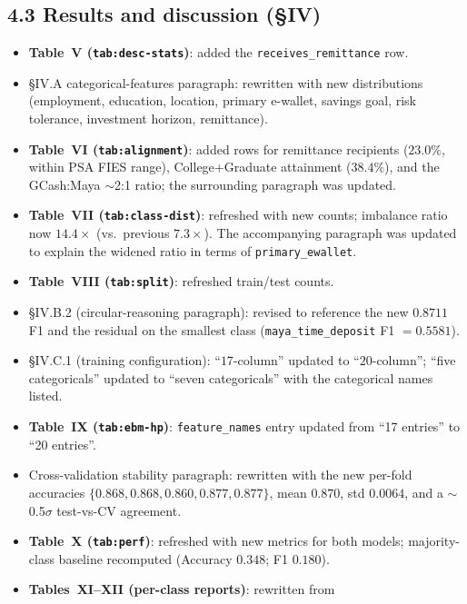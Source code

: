 \documentclass[11pt,a4paper]{article}
\begin{document}
\subsection*{4.3 Results and discussion (\S IV)}

\begin{itemize}
    \item \textbf{Table~V (\texttt{tab:desc-stats})}: added the
    \texttt{receives\_remittance} row.
    \item \S IV.A categorical-features paragraph: rewritten with new
    distributions (employment, education, location, primary e-wallet,
    savings goal, risk tolerance, investment horizon, remittance).
    \item \textbf{Table~VI (\texttt{tab:alignment})}: added rows for
    remittance recipients ($23.0\%$, within PSA FIES range), College+Graduate
    attainment ($38.4\%$), and the GCash:Maya $\sim$2:1 ratio; the
    surrounding paragraph was updated.
    \item \textbf{Table~VII (\texttt{tab:class-dist})}: refreshed with
    new counts; imbalance ratio now $14.4\times$ (vs.\ previous
    $7.3\times$). The accompanying paragraph was updated to explain
    the widened ratio in terms of \texttt{primary\_ewallet}.
    \item \textbf{Table~VIII (\texttt{tab:split})}: refreshed train/test
    counts.
    \item \S IV.B.2 (circular-reasoning paragraph): revised to
    reference the new $0.8711$ F1 and the residual on the smallest
    class (\texttt{maya\_time\_deposit} F1 $=0.5581$).
    \item \S IV.C.1 (training configuration): ``$17$-column'' updated
    to ``$20$-column''; ``five categoricals'' updated to ``seven
    categoricals'' with the categorical names listed.
    \item \textbf{Table~IX (\texttt{tab:ebm-hp})}:
    \texttt{feature\_names} entry updated from ``17 entries'' to ``20
    entries''.
    \item Cross-validation stability paragraph: rewritten with the new
    per-fold accuracies $\{0.868, 0.868, 0.860, 0.877, 0.877\}$, mean
    $0.870$, std $0.0064$, and a $\sim$0.5$\sigma$ test-vs-CV
    agreement.
    \item \textbf{Table~X (\texttt{tab:perf})}: refreshed with new
    metrics for both models; majority-class baseline recomputed
    (Accuracy $0.348$; F1 $0.180$).
    \item \textbf{Tables~XI--XII (per-class reports)}: rewritten from

\end{itemize}
\end{document}
